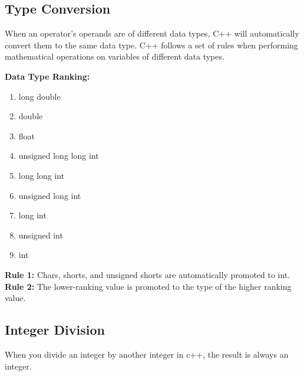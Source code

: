 \documentclass{report}
\begin{document}
    \bigbreak \noindent 
    \bigbreak \noindent 
%     
%
%
%
%
%     

    \bigbreak \noindent   
    \subsection{Type Conversion}
    \begin{concept}
 When an operator's operands are of different data types, C++ will automatically convert them to the same data type. C++ follows a set of rules when performing mathematical operations on variables of different data types.
	\end{concept}
    \bigbreak \noindent 
    \textbf{Data Type Ranking:}
    \begin{enumerate}
        \item long double
        \item double 
        \item float
        \item unsigned long long int
        \item long long int
        \item unsigned long int
        \item long int
        \item unsigned int
        \item int
    \end{enumerate}
    \bigbreak \noindent 
    \textbf{Rule 1:} Chars, shorts, and unsigned shorts are automatically promoted to int.
    \bigbreak \noindent 
    \textbf{Rule 2:} The lower-ranking value is promoted to the type of the higher ranking value.


    \bigbreak \noindent
    \subsection{Integer Division}
    \bigbreak \noindent 
    \begin{concept}
 When you divide an integer by another integer in c++, the result is always an integer.
	\end{concept}
\end{document}
